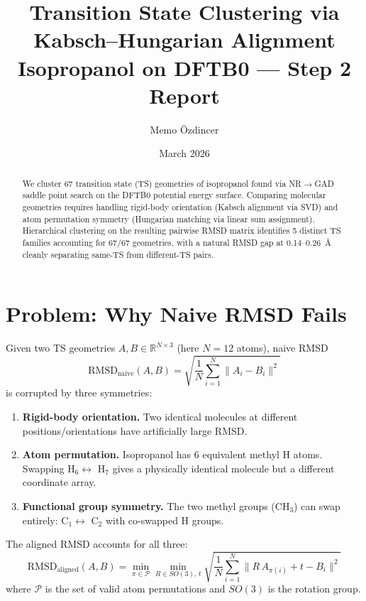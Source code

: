 \documentclass[11pt]{article}
\title{Transition State Clustering via Kabsch--Hungarian Alignment\\[0.3em]
\large Isopropanol on DFTB0 --- Step 2 Report}
\author{Memo \"Ozdincer}
\date{March 2026}
\begin{document}
\maketitle

\begin{abstract}
We cluster 67 transition state (TS) geometries of isopropanol found via NR$\to$GAD saddle point search on the DFTB0 potential energy surface.
Comparing molecular geometries requires handling rigid-body orientation (Kabsch alignment via SVD) and atom permutation symmetry (Hungarian matching via linear sum assignment).
Hierarchical clustering on the resulting pairwise RMSD matrix identifies 5 distinct TS families accounting for 67/67 geometries, with a natural RMSD gap at 0.14--0.26~\AA{} cleanly separating same-TS from different-TS pairs.
\end{abstract}

\section{Problem: Why Naive RMSD Fails}

Given two TS geometries $A, B \in \mathbb{R}^{N \times 3}$ (here $N = 12$ atoms), naive RMSD
\[
  \text{RMSD}_{\text{naive}}(A, B) = \sqrt{\frac{1}{N}\sum_{i=1}^{N} \|A_i - B_i\|^2}
\]
is corrupted by three symmetries:

\begin{enumerate}
  \item \textbf{Rigid-body orientation.} Two identical molecules at different positions/orientations have artificially large RMSD.
  \item \textbf{Atom permutation.} Isopropanol has 6 equivalent methyl H atoms. Swapping H$_6 \leftrightarrow$ H$_7$ gives a physically identical molecule but a different coordinate array.
  \item \textbf{Functional group symmetry.} The two methyl groups (CH$_3$) can swap entirely: C$_1 \leftrightarrow$ C$_2$ with co-swapped H groups.
\end{enumerate}

\noindent The aligned RMSD accounts for all three:
\[
  \text{RMSD}_{\text{aligned}}(A, B) = \min_{\pi \in \mathcal{P}} \min_{R \in SO(3),\, t} \sqrt{\frac{1}{N} \sum_{i=1}^{N} \|R\, A_{\pi(i)} + t - B_i\|^2}
\]
where $\mathcal{P}$ is the set of valid atom permutations and $SO(3)$ is the rotation group.

\end{document}
